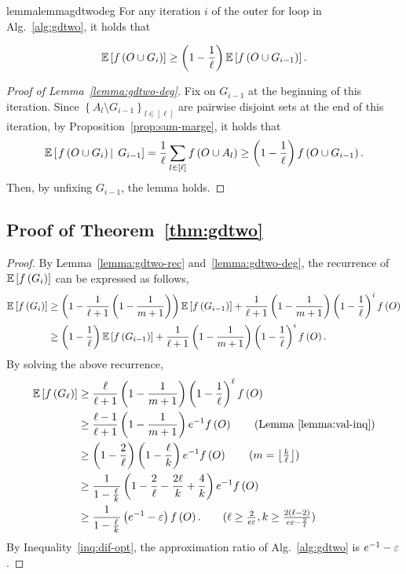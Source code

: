 \begin{restatable}{lemma}{lemmagdtwodeg}\label{lemma:gdtwo-deg}
For any iteration $i$ of the outer for loop in Alg.~\ref{alg:gdtwo},
it holds that

\vspace*{-1em}
{\small\begin{align*}
\mathbb{E}\left[ f \left( O\cup G_i \right) \right] \ge \left(1-\frac{1}{\ell}\right) \mathbb{E}\left[ f \left( O\cup G_{i-1} \right) \right].
\end{align*}}
\end{restatable}
\begin{proof}[Proof of Lemma~\ref{lemma:gdtwo-deg}]
Fix on $G_{i-1}$ at the beginning of this iteration.
Since $\left\{A_l\setminus G_{i-1}\right\}_{l\in [\ell]}$ 
are pairwise disjoint sets at the end of this iteration,
by Proposition~\ref{prop:sum-marge},
it holds that
\[\mathbb{E}\left[\left. f \left( O\cup G_i \right) \, \right| \; G_{i-1} \right] = \frac{1}{\ell}\sum_{l\in [\ell]}f \left( O\cup A_l \right) \ge \left(1-\frac{1}{\ell}\right)f \left( O\cup G_{i-1} \right).\]
Then, by unfixing $G_{i-1}$, the lemma holds.
\end{proof}

\subsection{Proof of Theorem~\ref{thm:gdtwo}}\label{apx:gdtwo-approx}
\thmgdtwo*
\begin{proof}
By Lemma~\ref{lemma:gdtwo-rec} and~\ref{lemma:gdtwo-deg},
the recurrence of $\mathbb{E}\left[ f \left( G_i \right) \right]$ can be expressed as follows,
\begin{align*}
\mathbb{E}\left[ f \left( G_i \right) \right] &\ge \left(1-\frac{1}{\ell+1}\left(1-\frac{1}{m+1}\right)\right)\mathbb{E}\left[ f \left( G_{i-1} \right) \right] + \frac{1}{\ell+1}\left(1-\frac{1}{m+1}\right)\left(1-\frac{1}{\ell}\right)^if \left( O \right)\\
&\ge \left(1-\frac{1}{\ell}\right)\mathbb{E}\left[ f \left( G_{i-1} \right) \right] + \frac{1}{\ell+1}\left(1-\frac{1}{m+1}\right)\left(1-\frac{1}{\ell}\right)^if \left( O \right).
\end{align*}
By solving the above recurrence,
\begin{align*}
\ex{\ff{G_{\ell}}} &\ge \frac{\ell}{\ell+1}\left(1-\frac{1}{m+1}\right)\left(1-\frac{1}{\ell}\right)^\ell\ff{O}\\
&\ge \frac{\ell-1}{\ell+1}\left(1-\frac{1}{m+1}\right)e^{-1}\ff{O}\tag{Lemma~\ref{lemma:val-inq}}\\
&\ge \left(1-\frac{2}{\ell}\right)\left(1-\frac{\ell}{k}\right)e^{-1}\ff{O} \tag{$m = \left\lfloor \frac{k}{\ell} \right\rfloor$}\\
&\ge \frac{1}{1-\frac{\ell}{k}}\left(1-\frac{2}{\ell}-\frac{2\ell}{k}+\frac{4}{k}\right)e^{-1}\ff{O}\\
&\ge \frac{1}{1-\frac{\ell}{k}}\left(e^{-1}-\epsi\right)\ff{O}. \tag{$\ell \ge \frac{2}{e\epsi}, k\ge \frac{2(\ell-2)}{e\epsi-\frac{2}{\ell}}$}
\end{align*}
By Inequality~\eqref{inq:dif-opt}, the approximation ratio of Alg.~\ref{alg:gdtwo} is $e^{-1}-\varepsilon$.
\end{proof}

